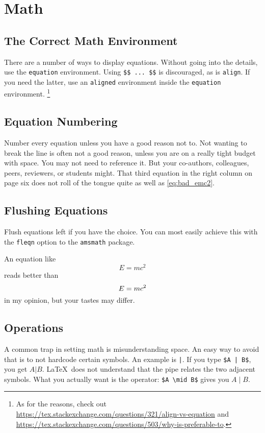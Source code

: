 \section{Math}

\subsection{The Correct Math Environment}
There are a number of ways to display equations.
Without going into the details, use the \verb|equation| environment.
Using \verb|$$ ... $$| is discouraged, as is \verb|align|.
If you need the latter, use an \verb|aligned| environment inside the \verb|equation| environment.%
\footnote{As for the reasons, check out \url{https://tex.stackexchange.com/questions/321/align-vs-equation} and \url{https://tex.stackexchange.com/questions/503/why-is-preferable-to}.}

\subsection{Equation Numbering}
Number every equation unless you have a good reason not to.
Not wanting to break the line is often not a good reason, unless you are on a really tight budget with space.
You may not need to reference it.
But your co-authors, colleagues, peers, reviewers, or students might.
That third equation in the right column on page six does not roll of the tongue quite as well as \cref{eq:bad_emc2}.

\subsection{Flushing Equations}

Flush equations left if you have the choice.
You can most easily achieve this with the \texttt{fleqn} option to the \texttt{amsmath} package.

An equation like
\begin{equation}
	E = mc^2
\end{equation}
reads better than
{\setlength{\mathindent}{0cm}\begin{equation}
	\noindent\hfill E = mc^2\hfill\label{eq:bad_emc2}
\end{equation}}
in my opinion, but your tastes may differ.

\subsection{Operations}
A common trap in setting math is misunderstanding space.
An easy way to avoid that is to not hardcode certain symbols.
An example is \verb+|+.
If you type \verb+$A | B$+, you get $A|B$.
\LaTeX\ does not understand that the pipe relates the two adjacent symbols.
What you actually want is the operator: \verb|$A \mid B$| gives you $A \mid B$.

